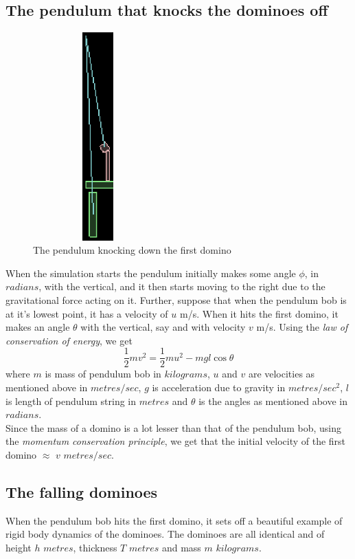 \documentclass[11pt]{article}
\begin{document}
\subsection{The pendulum that knocks the dominoes off}
\begin{figure}[h!]
\caption{The pendulum knocking down the first domino}
\centering
\includegraphics[width=5cm,height=8cm]{pendulum}
\end{figure}
When the simulation starts the pendulum initially makes some angle $\phi$, in $radians$,
 with the vertical, and it then starts moving to the right due to the gravitational force acting on it. Further, suppose that when the pendulum bob is at it's lowest point, it has a velocity of $u$ m/s. When it hits the first domino, it makes an angle $\theta$ with the vertical, say and with velocity $v$ m/s. 
Using the \emph{law of conservation of energy}, we get
\begin{equation}
\frac{1}{2} m v^2 = \frac{1}{2} m u^2 - mgl\cos\theta
\end{equation}
where $m$ is mass of pendulum bob in $kilograms$, $u$ and $v$ are velocities as mentioned above in $metres/{sec}$, $g$ is acceleration due to gravity in $metres/{sec}^2$, $l$ is length of pendulum string in $metres$ and $\theta$ is the angles as mentioned above in $radians$.
\\
Since the mass of a domino is a lot lesser than that of the pendulum bob, using  the \emph{momentum conservation principle}, we get that the initial velocity of the first domino $\approx$  $v$ $metres/sec$.

\subsection{The falling dominoes}
When the pendulum bob hits the first domino, it sets off a beautiful example of rigid body dynamics of the dominoes.
The dominoes are all identical and of height $h$ $metres$, thickness $T$ $metres$ and mass $m$ $kilograms$. 
\end{document}
